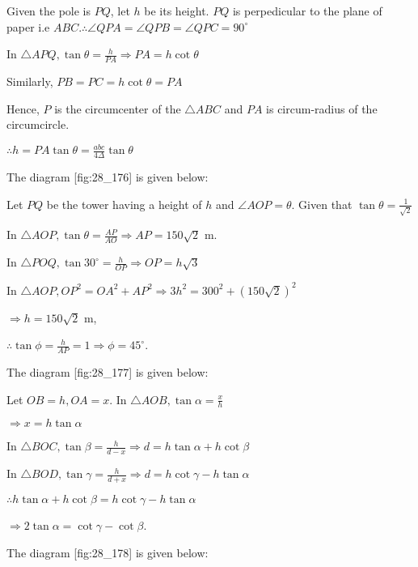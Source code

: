   Given the pole is $PQ$, let $h$ be its height. $PQ$ is perpedicular to the plane of
  paper i.e $ABC. \therefore \angle QPA = \angle QPB = \angle QPC = 90^\circ$

  In $\triangle APQ, \tan\theta = \frac{h}{PA} \Rightarrow PA = h\cot\theta$

  Similarly, $PB = PC = h\cot\theta = PA$

  Hence, $P$ is the circumcenter of the $\triangle ABC$ and $PA$ is circum-radius of
  the circumcircle.

  $\therefore h = PA\tan\theta = \frac{abc}{4\Delta}\tan\theta$

\item The diagram [fig:28_176] is given below:

  \startplacefigure[reference=fig:28_176]
    \externalfigure[28_176.pdf]
  \stopplacefigure

  Let $PQ$ be the tower having a height of $h$ and $\angle AOP = \theta$. Given that
  $\tan\theta = \frac{1}{\sqrt{2}}$

  In $\triangle AOP, \tan\theta = \frac{AP}{AO} \Rightarrow AP = 150\sqrt{2}$ m.

  In $\triangle POQ, \tan30^\circ = \frac{h}{OP} \Rightarrow OP = h\sqrt{3}$

  In $\triangle AOP, OP^2 = OA^2 + AP^2 \Rightarrow 3h^2 = 300^2 + (150\sqrt{2})^2$

  $\Rightarrow h = 150\sqrt{2}$ m,

  $\therefore \tan\phi = \frac{h}{AP} = 1 \Rightarrow \phi = 45^\circ$.

\item The diagram [fig:28_177] is given below:

  \startplacefigure[reference=fig:28_177]
    \externalfigure[28_177.pdf]
  \stopplacefigure

  Let $OB = h, OA = x$. In $\triangle AOB, \tan\alpha =\frac{x}{h}$

  $\Rightarrow x = h\tan\alpha$

  In $\triangle BOC, \tan\beta = \frac{h}{d - x} \Rightarrow d = h\tan\alpha + h\cot\beta$

  In $\triangle BOD, \tan\gamma = \frac{h}{d + x}\Rightarrow d = h\cot\gamma - h\tan\alpha$

  $\therefore h\tan\alpha + h\cot\beta = h\cot\gamma - h\tan\alpha$

  $\Rightarrow 2\tan\alpha = \cot\gamma - \cot\beta$.

\item The diagram [fig:28_178] is given below:

